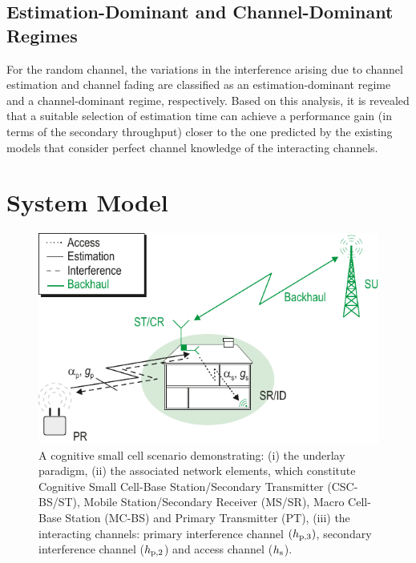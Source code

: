 \subsection{Estimation-Dominant and Channel-Dominant Regimes}
For the random channel, the variations in the interference arising due to channel estimation and channel fading are classified as an estimation-dominant regime and a channel-dominant regime, respectively. Based on this analysis, it is revealed that a suitable selection of estimation time can achieve a performance gain (in terms of the secondary throughput) closer to the one predicted by the existing models that consider perfect channel knowledge of the interacting channels.


\section{System Model} \label{sec_US:sys_mod}
\begin{figure}[!ht]
\centering
\includegraphics[width = \figscalet]{figures/CR_Scenario_Underlay}
\caption{A cognitive small cell scenario demonstrating: (i) the underlay paradigm, (ii) the associated network elements, which constitute Cognitive Small Cell-Base Station/Secondary Transmitter (CSC-BS/ST), Mobile Station/Secondary Receiver (MS/SR), Macro Cell-Base Station (MC-BS) and Primary Transmitter (PT), (iii) the interacting channels: primary interference channel $(h_{\text{p,3}})$, secondary interference channel ($h_{\text{p,2}}$) and access channel ($h_{\text{s}}$).}
\label{fig_US:scenario}
\end{figure}

